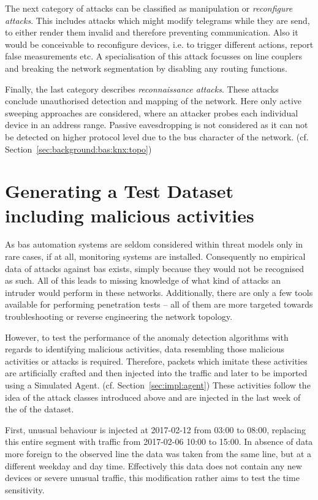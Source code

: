 The next category of attacks can be classified as manipulation or \emph{reconfigure attacks}. This includes attacks which might modify telegrams while they are send, to either render them invalid and therefore preventing communication. Also it would be conceivable to reconfigure devices, i.e. to trigger different actions, report false measurements etc. A specialisation of this attack focusses on line couplers and breaking the network segmentation by disabling any routing functions.

Finally, the last category describes \emph{reconnaissance attacks}. These attacks conclude unauthorised detection and mapping of the network. Here only active sweeping approaches are considered, where an attacker probes each individual device in an address range.
Passive eavesdropping is not considered as it can not be detected on higher protocol level due to the bus character of the network. (cf. Section~\ref{sec:background:bas:knx:topo})

\section{Generating a Test Dataset including malicious activities}
\label{sec:methods:gen-test}

As \gls{bas} automation systems are seldom considered within threat models only in rare cases, if at all, monitoring systems are installed.
Consequently no empirical data of attacks against \gls{bas} exists, simply because they would not be recognised as such.
All of this leads to missing knowledge of what kind of attacks an intruder would perform in these networks.
Additionally, there are only a few tools available for performing penetration tests -- all of them are more targeted towards troubleshooting or reverse engineering the network topology.

However, to test the performance of the anomaly detection algorithms with regards to identifying malicious activities, data resembling those malicious activities or attacks is required.
Therefore, packets which imitate these activities are artificially crafted and then injected into the traffic and later to be imported using a Simulated Agent. (cf. Section~\ref{sec:impl:agent})
These activities follow the idea of the attack classes introduced above and are injected in the last week of the of the dataset.

First, unusual behaviour is injected at 2017-02-12 from 03:00 to 08:00, replacing this entire segment with traffic from 2017-02-06 10:00 to 15:00. In absence of data more foreign to the observed line the data was taken from the same line, but at a different weekday and day time. Effectively this data does not contain any new devices or severe unusual traffic, this modification rather aims to test the time sensitivity.

